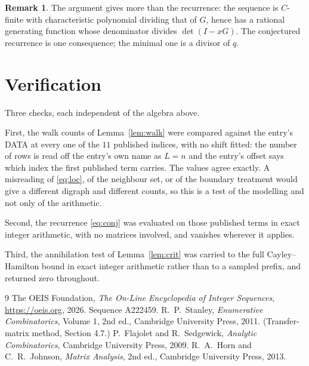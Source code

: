 \documentclass[11pt,a4paper]{article}
\theoremstyle{plain}
\theoremstyle{definition}
\newtheorem{remark}[theorem]{Remark}
\begin{document}
\begin{remark}
The argument gives more than the recurrence: the sequence is $C$-finite with characteristic
polynomial dividing that of $G$, hence has a rational generating function whose denominator
divides $\det(I-xG)$. The conjectured recurrence is one consequence; the minimal one is a
divisor of $q$.
\end{remark}

\section{Verification}

Three checks, each independent of the algebra above.

First, the walk counts of Lemma~\ref{lem:walk} were compared against the entry's DATA at
every one of the $11$ published indices, with no shift fitted: the number of rows is
read off the entry's own name as $L=n$ and the entry's offset says which index the first
published term carries. The values agree exactly. A misreading of \eqref{eq:loc}, of the
neighbour set, or of the boundary treatment would give a different digraph and different
counts, so this is a test of the modelling and not only of the arithmetic.

Second, the recurrence \eqref{eq:conj} was evaluated on those published terms in exact
integer arithmetic, with no matrices involved, and vanishes wherever it applies.

Third, the annihilation test of Lemma~\ref{lem:crit} was carried to the full
Cayley--Hamilton bound in exact integer arithmetic rather than to a sampled prefix, and
returned zero throughout.

\begin{thebibliography}{9}
 The OEIS Foundation, \emph{The On-Line Encyclopedia of Integer
Sequences}, \url{https://oeis.org}, 2026. Sequence A222459.
 R.~P.~Stanley, \emph{Enumerative Combinatorics}, Volume 1, 2nd ed.,
Cambridge University Press, 2011. (Transfer-matrix method, Section 4.7.)
 P.~Flajolet and R.~Sedgewick, \emph{Analytic Combinatorics}, Cambridge
University Press, 2009.
 R.~A.~Horn and C.~R.~Johnson, \emph{Matrix Analysis}, 2nd ed., Cambridge
University Press, 2013.
\end{thebibliography}
\end{document}
